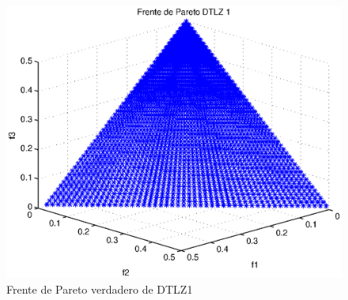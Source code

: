 \begin{figure}
    \centering
    \includegraphics[scale=0.7]{ApendiceA/paretoDTLZ1.eps}
    \caption{Frente de Pareto verdadero de DTLZ1}
    \label{fig:dtlz1}
\end{figure}

